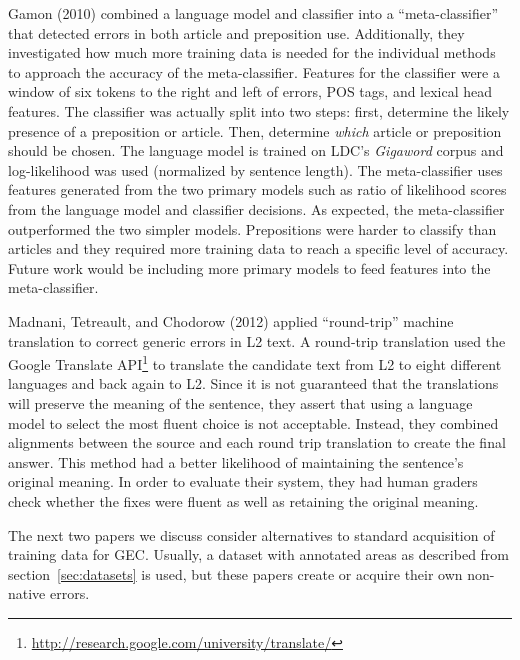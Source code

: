 Gamon (2010) combined a language model and classifier into a
``meta-classifier'' that detected errors in both article and preposition use.
Additionally, they investigated how much more training data is needed for the
individual methods to approach the accuracy of the meta-classifier. Features for
the classifier were a window of six tokens to the right and left of errors, POS
tags, and lexical head features. The classifier was actually split into two
steps: first, determine the likely presence of a preposition or article. Then,
determine \emph{which} article or preposition should be chosen. The language
model is trained on LDC's \emph{Gigaword} corpus and log-likelihood was
used (normalized by sentence length). The meta-classifier uses features
generated from the two primary models such as ratio of likelihood scores from
the language model and classifier decisions. As expected, the meta-classifier
outperformed the two simpler models. Prepositions were harder to classify than
articles and they required more training data to reach a specific level of
accuracy. Future work would be including more primary models to feed features
into the meta-classifier.

Madnani, Tetreault, and Chodorow (2012) applied ``round-trip'' machine translation to correct generic
errors in L2 text. A round-trip translation used the Google Translate
API\footnote{\url{http://research.google.com/university/translate/}} to
translate the candidate text from L2 to eight different languages and back again
to L2. Since it is not guaranteed that the translations will preserve the
meaning of the sentence, they assert that using a language model to select the
most fluent choice is not acceptable. Instead, they combined alignments between
the source and each round trip translation to create the final answer. This
method had a better likelihood of maintaining the sentence's original meaning.
In order to evaluate their system, they had human graders check whether the
fixes were fluent as well as retaining the original meaning.

The next two papers we discuss consider alternatives to standard acquisition of
training data for GEC\@. Usually, a dataset with annotated areas as described
from section~\ref{sec:datasets} is used, but these papers create or acquire
their own non-native errors.

